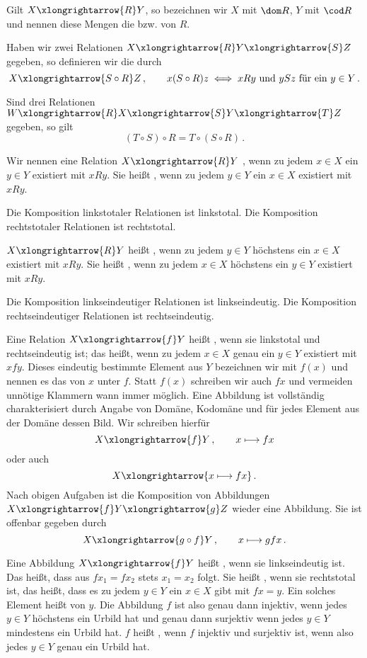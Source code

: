 Gilt $X\xlongrightarrow{R}Y$, so bezeichnen wir $X$ mit $\dom R$, $Y$ mit $\cod R$ und nennen diese Mengen die  bzw.  von $R$.

Haben wir zwei Relationen $X\xlongrightarrow{R}Y\xlongrightarrow{S}Z$ gegeben, so definieren wir die  durch
\[
X\xlongrightarrow{S\circ R}Z\,,\qquad x(S\circ R)z\iff xRy\textnormal{ und }ySz\textnormal{ für ein }y\in Y\,.
\]
\begin{auf}
Sind drei Relationen $W\xlongrightarrow{R}X\xlongrightarrow{S}Y\xlongrightarrow{T}Z$ gegeben, so gilt
\[(T\circ S)\circ R=T\circ(S\circ R)\,.\]
\end{auf}
Wir nennen eine Relation $X\xlongrightarrow{R}Y$ , wenn zu jedem $x\in X$ ein $y\in Y$ existiert mit $xRy$. Sie heißt , wenn zu jedem $y\in Y$ ein $x\in X$ existiert mit $xRy$.
\begin{auf}
Die Komposition linkstotaler Relationen ist linkstotal. Die Komposition rechtstotaler Relationen ist rechtstotal.
\end{auf}
$X\xlongrightarrow{R}Y$ heißt , wenn zu jedem $y\in Y$ höchstens ein $x\in X$ existiert mit $xRy$. Sie heißt , wenn zu jedem $x\in X$ höchstens ein $y\in Y$ existiert mit $xRy$.
\begin{auf}
Die Komposition linkseindeutiger Relationen ist linkseindeutig. Die Komposition rechtseindeutiger Relationen ist rechtseindeutig.
\end{auf}
Eine Relation $X\xlongrightarrow{f}Y$ heißt , wenn sie linkstotal und rechtseindeutig ist; das heißt, wenn zu jedem $x\in X$ genau ein $y\in Y$ existiert mit $xfy$. Dieses eindeutig bestimmte Element aus $Y$ bezeichnen wir mit $f(x)$ und nennen es das  von $x$ unter $f$. Statt $f(x)$ schreiben wir auch $fx$ und vermeiden unnötige Klammern wann immer möglich. Eine Abbildung ist vollständig charakterisiert durch Angabe von Domäne, Kodomäne und für jedes Element aus der Domäne dessen Bild. Wir schreiben hierfür
\[
X\xlongrightarrow{f}Y\,,\qquad x\longmapsto fx
\]
oder auch
\[
X\xlongrightarrow{x\longmapsto fx}\,.
\]
Nach obigen Aufgaben ist die Komposition von Abbildungen $X\xlongrightarrow{f}Y\xlongrightarrow{g}Z$ wieder eine Abbildung. Sie ist offenbar gegeben durch
\[
X\xlongrightarrow{g\circ f}Y\,,\qquad x\longmapsto gfx\,.
\]

Eine Abbildung $X\xlongrightarrow{f}Y$ heißt , wenn sie linkseindeutig ist. Das heißt, dass aus $fx_1=fx_2$ stets $x_1=x_2$ folgt. Sie heißt , wenn sie rechtstotal ist, das heißt, dass es zu jedem $y\in Y$ ein $x\in X$ gibt mit $fx=y$. Ein solches Element heißt  von $y$. Die Abbildung $f$ ist also genau dann injektiv, wenn jedes $y\in Y$ höchstens ein Urbild hat und genau dann surjektiv wenn jedes $y\in Y$ mindestens ein Urbild hat. $f$ heißt , wenn $f$ injektiv und surjektiv ist, wenn also jedes $y\in Y$ genau ein Urbild hat.

